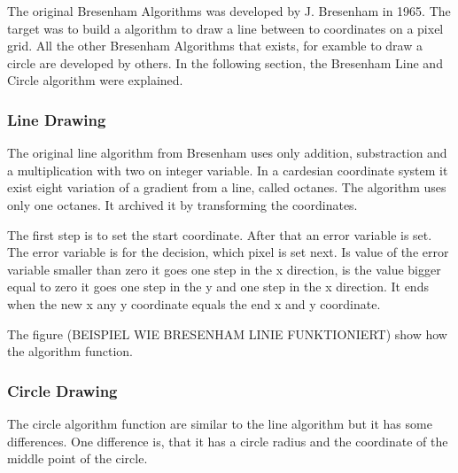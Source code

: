 The original Bresenham Algorithms was developed by J. Bresenham in 1965. The target was to build a algorithm to draw a line between to coordinates on a pixel grid. All the other Bresenham Algorithms that exists, for examble to draw a circle are developed by others. In the following section, the Bresenham Line and Circle algorithm were explained.
\subsubsection*{Line Drawing}
The original line algorithm from Bresenham uses only addition, substraction and a multiplication with two on integer variable. In a cardesian coordinate system it exist eight variation of a gradient from a line, called octanes. The algorithm uses only one octanes. It archived it by transforming the coordinates.

The first step is to set the start coordinate. After that an error variable is set. The error variable is for the decision, which pixel is set next. Is value of the error variable smaller than zero it goes one step in the x direction, is the value bigger equal to zero it goes one step in the y and one step in the x direction. It ends when the new x any y coordinate equals the end x and y coordinate.

The figure (BEISPIEL WIE BRESENHAM LINIE FUNKTIONIERT) show how the algorithm function. 
\subsubsection*{Circle Drawing}
The circle algorithm function are similar to the line algorithm but it has some differences. One difference is, that it has a circle radius and the coordinate of the middle point of the circle. 
